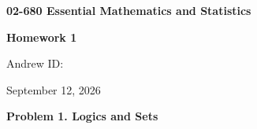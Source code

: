 \documentclass[12pt]{article}
\begin{document}
\begin{center}

    {\Large \textbf{02-680 Essential Mathematics and Statistics}}
    
    \vspace{0.4em}
    
    {\large \textbf{Homework 1}}
    
    \vspace{0.7em}
    

    
    \vspace{0.2em}
    
    Andrew ID: 
    
    \vspace{0.2em}
    
    September 12, 2026

\end{center}

\vspace{1em}


\vspace{1em}

\vspace{1em}

\textbf{Problem 1. Logics and Sets}
\end{document}
